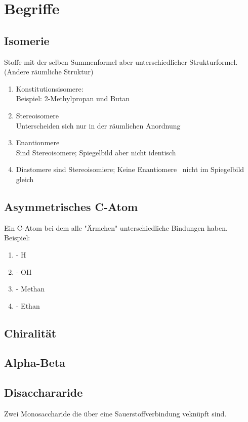 
\section{Begriffe} \label{sec:begriffe}
\subsection{Isomerie}
Stoffe mit der selben Summenformel aber unterschiedlicher Strukturformel. (Andere räumliche Struktur)
\begin{enumerate}
    \item Konstitutionsisomere: \\
        Beispiel: 2-Methylpropan und Butan

    \item Stereoisomere \\
        Unterscheiden sich nur in der räumlichen Anordnung
    \item Enantionmere \\
        Sind Stereoisomere; Spiegelbild aber nicht identisch
    \item Diastomere
        sind Stereoisomiere; Keine Enantiomere \textrightarrow\ nicht im Spiegelbild gleich

\end{enumerate}
\subsection{Asymmetrisches C-Atom}
Ein C-Atom bei dem alle "Ärmchen" unterschiedliche Bindungen haben. \\
Beispiel:
\begin{enumerate}
    \item - H
    \item - OH
    \item - Methan
    \item - Ethan
\end{enumerate}

\subsection{Chiralität}
\subsection{Alpha-Beta}


\subsection{Disacchararide}
Zwei Monosaccharide die über eine Sauerstoffverbindung veknüpft sind.
